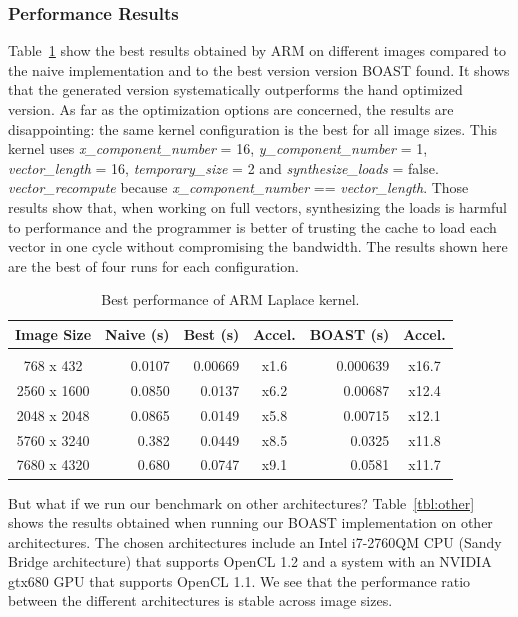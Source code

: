 \documentclass{IEEEtran}
\begin{document}
    \subsubsection{Performance Results}

Table~\ref{tbl:ARM} show the best results obtained by ARM on different images
compared to the naive implementation and to the best version version BOAST
found. It shows that the generated version systematically outperforms the hand
optimized version. As far as the optimization options are concerned, the results
are disappointing: the same kernel configuration is the best for all image
sizes. This kernel uses \emph{x\_component\_number} = 16,
\emph{y\_component\_number} = 1, \emph{vector\_length} = 16,
\emph{temporary\_size} = 2 and \emph{synthesize\_loads} = false.
\emph{vector\_recompute} because \emph{x\_component\_number}
== \emph{vector\_length}. Those results show that, when working on full
vectors, synthesizing the loads is harmful to performance and the programmer is
better of trusting the cache to load each vector in one cycle without
compromising the bandwidth. The results shown here are the best of four runs for
each configuration.

\begin{table}
\caption{Best performance of ARM Laplace kernel.}
\label{tbl:ARM}
\centering
\begin{tabular}{c|r|r|c|r|c}
  Image Size  & Naive (s) & Best (s) & Accel. & BOAST (s) & Accel. \\[4pt]
  \hline&&&&\\[-8pt]
768 x 432   & 0.0107    & 0.00669  & x1.6         & 0.000639  & x16.7 \\
2560 x 1600 & 0.0850    & 0.0137   & x6.2         & 0.00687   & x12.4 \\
2048 x 2048 & 0.0865    & 0.0149   & x5.8         & 0.00715   & x12.1 \\
5760 x 3240 & 0.382     & 0.0449   & x8.5         & 0.0325    & x11.8 \\
7680 x 4320 & 0.680     & 0.0747   & x9.1         & 0.0581    & x11.7 \\
\end{tabular}
\end{table}

But what if we run our benchmark on other architectures? Table~\ref{tbl:other}
shows the results obtained when running our BOAST implementation on other
architectures. The chosen architectures include an Intel i7-2760QM CPU (Sandy
Bridge architecture) that supports OpenCL 1.2 and a system with an NVIDIA
gtx680 GPU that supports OpenCL 1.1. We see that the performance ratio between
the different architectures is stable across image sizes.
\end{document}
